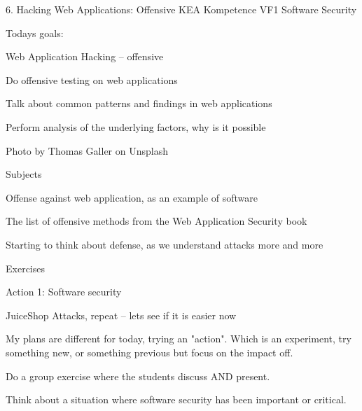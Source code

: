 \documentclass[Screen16to9,17pt]{foils}
\begin{document}
\mytitlepage
{6. Hacking Web Applications: Offensive}
{KEA Kompetence VF1 Software Security}




Todays goals:
\begin{list2}
\item Web Application Hacking -- offensive
\item Do offensive testing on web applications
\item Talk about common patterns and findings in web applications
\item Perform analysis of the underlying factors, why is it possible
\end{list2}

Photo by Thomas Galler on Unsplash




\begin{list1}
\item Subjects
\begin{list2}
\item Offense against web application, as an example of software
\item The list of offensive methods from the Web Application Security book
\item Starting to think about defense, as we understand attacks more and more
\end{list2}
\item Exercises
\begin{list2}
\item Action 1: Software security
\item JuiceShop Attacks, repeat -- lets see if it is easier now
\end{list2}
\end{list1}

My plans are different for today, trying an "action". Which is an experiment,
try something new, or something previous but focus on the impact off.


Do a group exercise where the students discuss AND present.

Think about a situation where software security has been important or critical.
\end{document}
